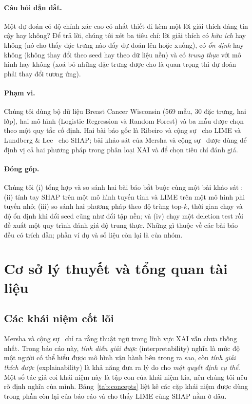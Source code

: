 \documentclass[11pt,a4paper]{article}
\begin{document}
\paragraph{Câu hỏi dẫn dắt.} Một dự đoán có độ chính xác cao có nhất thiết đi
kèm một lời giải thích đáng tin cậy hay không? Để trả lời, chúng tôi xét ba
tiêu chí: lời giải thích có \emph{hữu ích} hay không (nó cho thấy đặc trưng
nào đẩy dự đoán lên hoặc xuống), có \emph{ổn định} hay không (không thay đổi
theo seed hay theo dữ liệu nền) và có \emph{trung thực} với mô hình hay không
(xoá bỏ những đặc trưng được cho là quan trọng thì dự đoán phải thay đổi
tương ứng).

\paragraph{Phạm vi.} Chúng tôi dùng bộ dữ liệu Breast Cancer Wisconsin
\cite{street} (569 mẫu, 30 đặc trưng, hai lớp), hai mô hình (Logistic
Regression và Random Forest) và ba mẫu được chọn theo một quy tắc cố định.
Hai bài báo gốc là Ribeiro và cộng sự~\cite{ribeiro} cho LIME và Lundberg \&
Lee~\cite{lundberg} cho SHAP; bài khảo sát của Mersha và cộng
sự~\cite{mersha} được dùng để định vị cả hai phương pháp trong phân loại XAI
và để chọn tiêu chí đánh giá.

\paragraph{Đóng góp.} Chúng tôi (i) tổng hợp và so sánh hai bài báo bắt buộc
\cite{ribeiro}\cite{lundberg} cùng một bài khảo sát \cite{mersha}; (ii) tính
tay SHAP trên một mô hình tuyến tính và LIME trên một mô hình phi tuyến nhỏ;
(iii) so sánh hai phương pháp theo độ trùng top-$k$, thời gian chạy và độ ổn
định khi đổi seed cũng như đổi tập nền; và (iv) chạy một deletion test rồi đề
xuất một quy trình đánh giá độ trung thực. Những gì thuộc về các bài báo đều
có trích dẫn; phần ví dụ và số liệu còn lại là của nhóm.

\section{Cơ sở lý thuyết và tổng quan tài liệu}

\subsection{Các khái niệm cốt lõi}
Mersha và cộng sự~\cite{mersha} chỉ ra rằng thuật ngữ trong lĩnh vực XAI vẫn
chưa thống nhất. Trong báo cáo này, \emph{tính diễn giải được}
(interpretability) nghĩa là mức độ một người có thể hiểu được mô hình vận
hành bên trong ra sao, còn \emph{tính giải thích được} (explainability) là
khả năng đưa ra lý do cho \emph{một quyết định cụ thể}. Một số tác giả coi
khái niệm này là tập con của khái niệm kia, nên chúng tôi nêu rõ định nghĩa
của mình. Bảng~\ref{tab:concepts} liệt kê các cặp khái niệm được dùng trong
phần còn lại của báo cáo và cho thấy LIME cùng SHAP nằm ở đâu.
\end{document}
